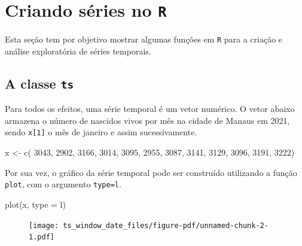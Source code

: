 \documentclass[
  letterpaper,
  DIV=11,
  numbers=noendperiod]{scrreprt}
\newenvironment{Shaded}{\begin{snugshade}}{\end{snugshade}}
\newcommand{\AttributeTok}[1]{\textcolor[rgb]{0.40,0.45,0.13}{#1}}
\newcommand{\DecValTok}[1]{\textcolor[rgb]{0.68,0.00,0.00}{#1}}
\newcommand{\FunctionTok}[1]{\textcolor[rgb]{0.28,0.35,0.67}{#1}}
\newcommand{\NormalTok}[1]{\textcolor[rgb]{0.00,0.23,0.31}{#1}}
\newcommand{\OtherTok}[1]{\textcolor[rgb]{0.00,0.23,0.31}{#1}}
\newcommand{\StringTok}[1]{\textcolor[rgb]{0.13,0.47,0.30}{#1}}
\theoremstyle{definition}
\theoremstyle{plain}
\theoremstyle{definition}
\theoremstyle{plain}
\theoremstyle{remark}
\begin{document}

\hypertarget{criando-suxe9ries-no-r}{%
\chapter{\texorpdfstring{Criando séries no
\texttt{R}}{Criando séries no R}}\label{criando-suxe9ries-no-r}}

Esta seção tem por objetivo mostrar algumas funções em \texttt{R} para a
criação e análise exploratória de séries temporais.

\hypertarget{a-classe-ts}{%
\section{\texorpdfstring{A classe
\texttt{ts}}{A classe ts}}\label{a-classe-ts}}

Para todos os efeitos, uma série temporal é um vetor numérico. O vetor
abaixo armazena o número de nascidos vivos por mês na cidade de Manaus
em 2021, sendo \texttt{x{[}1{]}} o mês de janeiro e assim
sucessivamente.

\begin{Shaded}
\begin{Highlighting}[]
\NormalTok{x }\OtherTok{\textless{}{-}} \FunctionTok{c}\NormalTok{( }\DecValTok{3043}\NormalTok{, }\DecValTok{2902}\NormalTok{, }\DecValTok{3166}\NormalTok{, }\DecValTok{3014}\NormalTok{, }\DecValTok{3095}\NormalTok{, }\DecValTok{2955}\NormalTok{, }\DecValTok{3087}\NormalTok{, }\DecValTok{3141}\NormalTok{,}
\DecValTok{3129}\NormalTok{, }\DecValTok{3096}\NormalTok{, }\DecValTok{3191}\NormalTok{, }\DecValTok{3222}\NormalTok{)}
\end{Highlighting}
\end{Shaded}

Por sua vez, o gráfico da série temporal pode ser construído utilizando
a função \texttt{plot}, com o argumento
\texttt{type=\textquotesingle{}l\textquotesingle{}}.

\begin{Shaded}
\begin{Highlighting}[]
\FunctionTok{plot}\NormalTok{(x, }\AttributeTok{type =} \StringTok{\textquotesingle{}l\textquotesingle{}}\NormalTok{)}
\end{Highlighting}
\end{Shaded}

\begin{figure}[H]

{\centering \texttt{[image: ts\_window\_date\_files/figure-pdf/unnamed-chunk-2-1.pdf]}

}

\end{figure}
\end{document}
